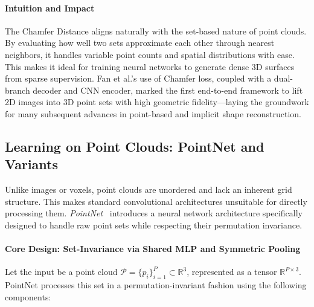\paragraph{Intuition and Impact}
The Chamfer Distance aligns naturally with the set-based nature of point clouds. By evaluating how well two sets approximate each other through nearest neighbors, it handles variable point counts and spatial distributions with ease. This makes it ideal for training neural networks to generate dense 3D surfaces from sparse supervision. Fan et al.'s use of Chamfer loss, coupled with a dual-branch decoder and CNN encoder, marked the first end-to-end framework to lift 2D images into 3D point sets with high geometric fidelity—laying the groundwork for many subsequent advances in point-based and implicit shape reconstruction.

\subsection{Learning on Point Clouds: PointNet and Variants}
\label{subsec:chapter23_pointnet_variants}

Unlike images or voxels, point clouds are unordered and lack an inherent grid structure. This makes standard convolutional architectures unsuitable for directly processing them. \emph{PointNet}~\cite{qi2017_pointnet} introduces a neural network architecture specifically designed to handle raw point sets while respecting their permutation invariance.

\paragraph{Core Design: Set-Invariance via Shared MLP and Symmetric Pooling}
Let the input be a point cloud \( \mathcal{P} = \{p_i\}_{i=1}^P \subset \mathbb{R}^3 \), represented as a tensor \( \mathbb{R}^{P \times 3} \). PointNet processes this set in a permutation-invariant fashion using the following components:

